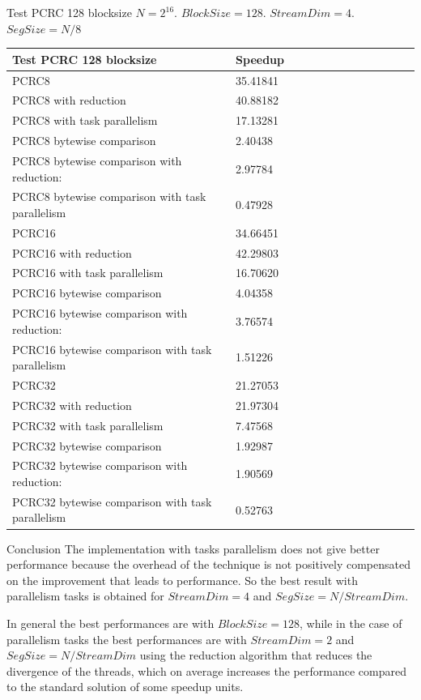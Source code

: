 \documentclass[10pt]{beamer}
\begin{document}
\begin{frame}[fragile]{Test PCRC 128 blocksize}
$N=2^{16}$. $BlockSize=128$. $StreamDim=4$. $SegSize=N/8$
\begin{footnotesize}
\begin{tabular}{l|l|l|l|l|r|r|r|r|r|r||c|c|}
\toprule
\textbf{Test PCRC 128 blocksize} & \textbf{Speedup} \\
\midrule
PCRC8                                           &	35.41841 \\
PCRC8 with reduction                            &	40.88182 \\
PCRC8 with task parallelism                     &	17.13281 \\
PCRC8 bytewise comparison                       &	2.40438  \\
PCRC8 bytewise comparison with reduction:       &	2.97784  \\
PCRC8 bytewise comparison with task parallelism &	0.47928  \\
PCRC16                                           &	34.66451 \\
PCRC16 with reduction                            &	42.29803 \\
PCRC16 with task parallelism                     &	16.70620 \\
PCRC16 bytewise comparison                       &	4.04358  \\
PCRC16 bytewise comparison with reduction:       &	3.76574  \\
PCRC16 bytewise comparison with task parallelism &	1.51226  \\
PCRC32                                           &	21.27053 \\
PCRC32 with reduction                            &	21.97304 \\
PCRC32 with task parallelism                     &	7.47568  \\
PCRC32 bytewise comparison                       &	1.92987  \\
PCRC32 bytewise comparison with reduction:       &	1.90569  \\
PCRC32 bytewise comparison with task parallelism &	0.52763  \\
\bottomrule
\end{tabular}
\end{footnotesize}
\end{frame}

\begin{frame}[fragile]{Conclusion}
The implementation with tasks parallelism does not give better performance 
because the overhead of the technique is not positively compensated on the 
improvement that leads to performance. So the best result with parallelism 
tasks is obtained for $StreamDim=4$ and $SegSize=N/StreamDim$. 

In general the best performances are with $BlockSize=128$, while in the case of 
parallelism tasks the best performances are with $StreamDim=2$ and 
$SegSize=N/StreamDim$ using the reduction algorithm that reduces the divergence 
of the threads, which on average increases the performance compared to the 
standard solution of some speedup units.
\end{frame}
\end{document}
